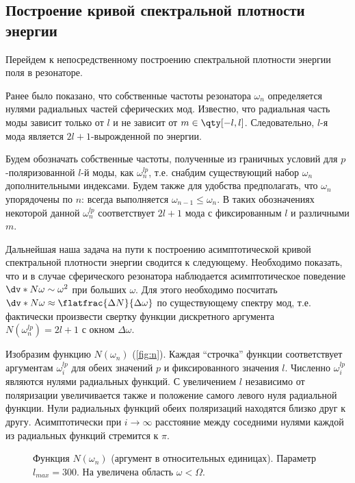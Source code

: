 %
%
%
%
%
%

\subsection{Построение кривой спектральной плотности энергии}

    Перейдем к непосредственному построению спектральной плотности энергии поля в резонаторе.

    Ранее было показано, что собственные частоты резонатора $\omega_n$ определяется нулями радиальных частей сферических мод. Известно, что радиальная часть моды зависит только от $l$ и не зависит от $m \in \qty[-l,l]$. Следовательно, $l$-я мода является $2l + 1$-вырожденной по энергии.

    Будем обозначать собственные частоты, полученные из граничных условий для $p$-поляризованной $l$-й моды, как $\omega^{lp}_n$, т.е. снабдим существующий набор $\omega_n$ дополнительными индексами. Будем также для удобства предполагать, что $\omega_n$ упорядочены по $n$: всегда выполняется $\omega_{n-1} \le \omega_n$. В таких обозначениях некоторой данной $\omega^{lp}_n$ соответствует $2l + 1$ мода с фиксированным $l$ и различными $m$.

    Дальнейшая наша задача на пути к построению асимптотической кривой спектральной плотности энергии сводится к следующему. Необходимо показать, что и в случае сферического резонатора наблюдается асимптотическое поведение $\dv*{N}{\omega} \sim \omega^2$ при больших $\omega$. Для этого необходимо посчитать $\dv*{N}{\omega} \approx \flatfrac{\Delta N}{\Delta \omega}$ по существующему спектру мод, т.е. фактически произвести свертку функции дискретного аргумента $N(\omega^{lp}_n) = 2l + 1$ с окном $\Delta \omega$.

    Изобразим функцию $N(\omega_n)$ (\autoref{fig:n}). Каждая \enquote{строчка} функции соответствует аргументам $\omega^{lp}_i$ для обеих значений $p$ и фиксированного значения $l$. Численно $\omega^{lp}_i$ являются нулями радиальных функций. С увеличением $l$ независимо от поляризации увеличивается также и положение самого левого нуля радиальной функции. Нули радиальных функций обеих поляризаций находятся близко друг к другу. Асимптотически при $i \to \infty$ расстояние между соседними нулями каждой из радиальных функций стремится к $\pi$.
    \begin{figure}[h]
        \centering
        \subfloat[][]{%
            \label{fig:n_all}%
            \texttt{[image: n]}}%
        \hspace{8pt}%
        \hspace{8pt}%
        \caption[]{Функция $N(\omega_n)$ (аргумент в относительных единицах). Параметр $l_{max} = 300$. На  увеличена область $\omega < \Omega$. %
        } %
        \label{fig:n}%
    \end{figure}

